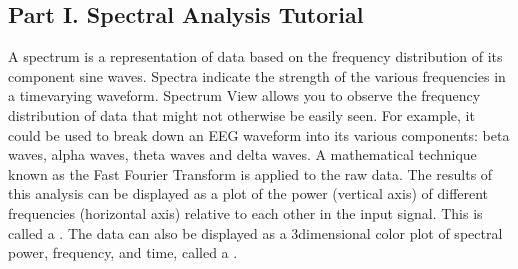 \documentclass[letterpaper,10pt,english]{jupyterBook}
\begin{document}
\subsection{Part I. Spectral Analysis Tutorial}
\label{\detokenize{EEG:part-i-spectral-analysis-tutorial}}
\sphinxAtStartPar
A spectrum is a representation of data based on the frequency distribution of its component sine waves. Spectra indicate the strength of the various frequencies in a time\sphinxhyphen{}varying waveform. Spectrum View allows you to observe the frequency distribution of data that might not otherwise be easily seen. For example, it could be used to break down an EEG waveform into its various components: beta waves, alpha waves, theta waves and delta waves. A mathematical technique known as the Fast Fourier Transform is applied to the raw data. The results of this analysis can be displayed as a plot of the power (vertical axis) of different frequencies (horizontal axis) relative to each other in the input signal. This is called a . The data can also be displayed as a 3\sphinxhyphen{}dimensional color plot of spectral power, frequency, and time, called a .
\end{document}
